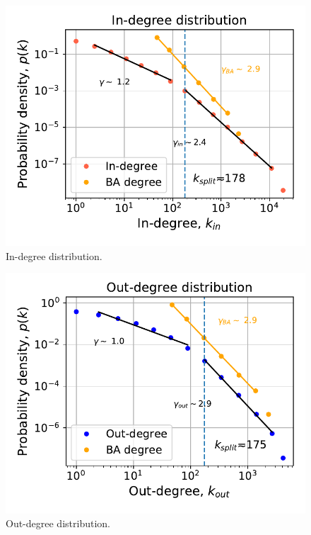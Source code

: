 \documentclass[11pt, twoside]{report}
\begin{document}
\begin{minipage}[b]{0.5\textwidth}
   \centering
    \begin{figure}[H]
      \includegraphics[width=\textwidth]{../../scripts/network_analysis/imgs/in_degree_distribution.pdf}            
          \caption{In-degree distribution.}
        \label{fig:in_degree}
\end{figure}
\end{minipage}
\begin{minipage}[b]{0.5\textwidth}
  \begin{figure}[H]
  \centering
  \includegraphics[width=\textwidth]{../../scripts/network_analysis/imgs/out_degree_distribution.pdf}            
        \caption{Out-degree distribution.}
\label{fig:out_degree}
\end{figure}
\end{minipage}
\end{document}
